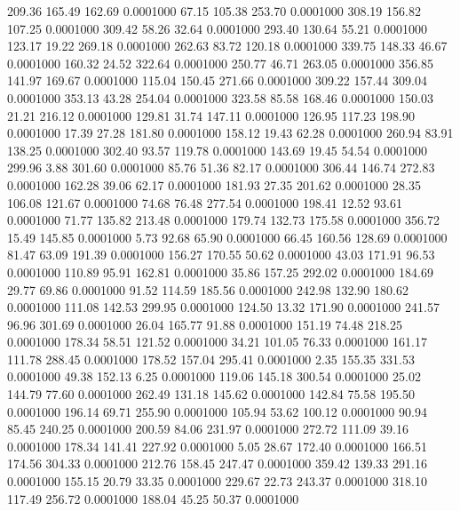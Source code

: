  209.36  165.49  162.69   0.0001000
  67.15  105.38  253.70   0.0001000
 308.19  156.82  107.25   0.0001000
 309.42   58.26   32.64   0.0001000
 293.40  130.64   55.21   0.0001000
 123.17   19.22  269.18   0.0001000
 262.63   83.72  120.18   0.0001000
 339.75  148.33   46.67   0.0001000
 160.32   24.52  322.64   0.0001000
 250.77   46.71  263.05   0.0001000
 356.85  141.97  169.67   0.0001000
 115.04  150.45  271.66   0.0001000
 309.22  157.44  309.04   0.0001000
 353.13   43.28  254.04   0.0001000
 323.58   85.58  168.46   0.0001000
 150.03   21.21  216.12   0.0001000
 129.81   31.74  147.11   0.0001000
 126.95  117.23  198.90   0.0001000
  17.39   27.28  181.80   0.0001000
 158.12   19.43   62.28   0.0001000
 260.94   83.91  138.25   0.0001000
 302.40   93.57  119.78   0.0001000
 143.69   19.45   54.54   0.0001000
 299.96    3.88  301.60   0.0001000
  85.76   51.36   82.17   0.0001000
 306.44  146.74  272.83   0.0001000
 162.28   39.06   62.17   0.0001000
 181.93   27.35  201.62   0.0001000
  28.35  106.08  121.67   0.0001000
  74.68   76.48  277.54   0.0001000
 198.41   12.52   93.61   0.0001000
  71.77  135.82  213.48   0.0001000
 179.74  132.73  175.58   0.0001000
 356.72   15.49  145.85   0.0001000
   5.73   92.68   65.90   0.0001000
  66.45  160.56  128.69   0.0001000
  81.47   63.09  191.39   0.0001000
 156.27  170.55   50.62   0.0001000
  43.03  171.91   96.53   0.0001000
 110.89   95.91  162.81   0.0001000
  35.86  157.25  292.02   0.0001000
 184.69   29.77   69.86   0.0001000
  91.52  114.59  185.56   0.0001000
 242.98  132.90  180.62   0.0001000
 111.08  142.53  299.95   0.0001000
 124.50   13.32  171.90   0.0001000
 241.57   96.96  301.69   0.0001000
  26.04  165.77   91.88   0.0001000
 151.19   74.48  218.25   0.0001000
 178.34   58.51  121.52   0.0001000
  34.21  101.05   76.33   0.0001000
 161.17  111.78  288.45   0.0001000
 178.52  157.04  295.41   0.0001000
   2.35  155.35  331.53   0.0001000
  49.38  152.13    6.25   0.0001000
 119.06  145.18  300.54   0.0001000
  25.02  144.79   77.60   0.0001000
 262.49  131.18  145.62   0.0001000
 142.84   75.58  195.50   0.0001000
 196.14   69.71  255.90   0.0001000
 105.94   53.62  100.12   0.0001000
  90.94   85.45  240.25   0.0001000
 200.59   84.06  231.97   0.0001000
 272.72  111.09   39.16   0.0001000
 178.34  141.41  227.92   0.0001000
   5.05   28.67  172.40   0.0001000
 166.51  174.56  304.33   0.0001000
 212.76  158.45  247.47   0.0001000
 359.42  139.33  291.16   0.0001000
 155.15   20.79   33.35   0.0001000
 229.67   22.73  243.37   0.0001000
 318.10  117.49  256.72   0.0001000
 188.04   45.25   50.37   0.0001000
